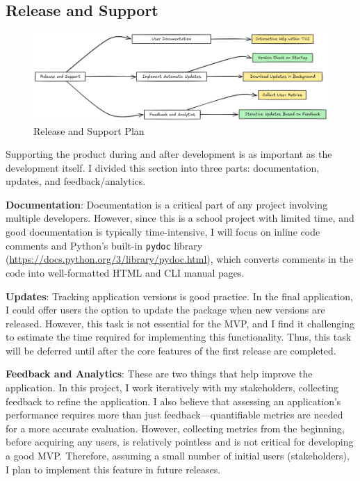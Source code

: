 \documentclass[10pt , a4paper]{report}
\begin{document}
\subsection{Release and Support}
\begin{figure}[htbp]
    \centering
    \includegraphics[width=1\linewidth]{imgs/ReleaseSupportDiagram.png}
    \caption{Release and Support Plan}
    \label{fig:release_support}
\end{figure}

Supporting the product during and after development is as important as the development itself. I divided this section into three parts: documentation, updates, and feedback/analytics.

\textbf{Documentation}: Documentation is a critical part of any project involving multiple developers. However, since this is a school project with limited time, and good documentation is typically time-intensive, I will focus on inline code comments and Python's built-in \texttt{pydoc} library (\url{https://docs.python.org/3/library/pydoc.html}), which converts comments in the code into well-formatted HTML and CLI manual pages.

\textbf{Updates}: Tracking application versions is good practice. In the final application, I could offer users the option to update the package when new versions are released. However, this task is not essential for the MVP, and I find it challenging to estimate the time required for implementing this functionality. Thus, this task will be deferred until after the core features of the first release are completed.

\textbf{Feedback and Analytics}: These are two things that help improve the application. In this project, I work iteratively with my stakeholders, collecting feedback to refine the application. I also believe that assessing an application's performance requires more than just feedback—quantifiable metrics are needed for a more accurate evaluation. However, collecting metrics from the beginning, before acquiring any users, is relatively pointless and is not critical for developing a good MVP. Therefore, assuming a small number of initial users (stakeholders), I plan to implement this feature in future releases.
\end{document}
